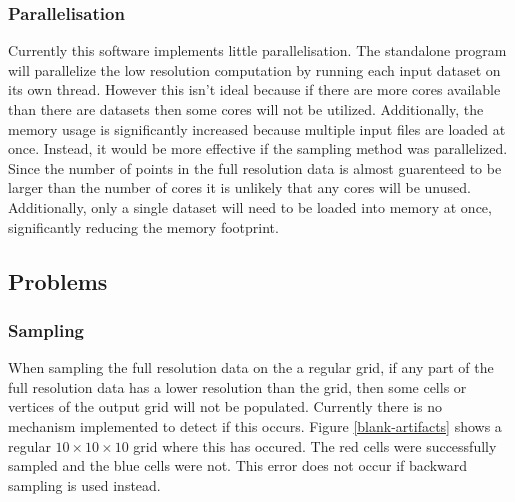 \documentclass[12pt,a4paper]{article}
\begin{document}
\subsubsection{Parallelisation}
Currently this software implements little parallelisation. The standalone program will parallelize the low resolution computation by running each input dataset on its own thread. However this isn't ideal because if there are more cores available than there are datasets then some cores will not be utilized. Additionally, the memory usage is significantly increased because multiple input files are loaded at once. Instead, it would be more effective if the sampling method was parallelized. Since the number of points in the full resolution data is almost guarenteed to be larger than the number of cores it is unlikely that any cores will be unused. Additionally, only a single dataset will need to be loaded into memory at once, significantly reducing the memory footprint.



\subsection{Problems}
\subsubsection{Sampling}
When sampling the full resolution data on the a regular grid, if any part of the full resolution data has a lower resolution than the grid, then some cells or vertices of the output grid will not be populated. Currently there is no mechanism  implemented to detect if this occurs. Figure \ref{blank-artifacts} shows a regular $10 \times 10 \times 10$ grid where this has occured. The red cells were successfully sampled and the blue cells were not. This error does not occur if backward sampling is used instead.
\end{document}
